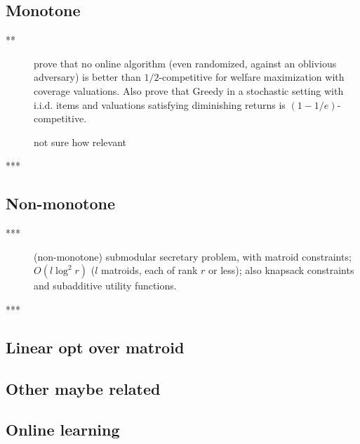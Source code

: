 \documentclass{article}
\begin{document}
\subsection{Monotone}

\begin{description}
\item[\citet{kapralov13}**] prove that no online algorithm (even randomized, against an oblivious adversary) is better than $1/2$-competitive for welfare maximization with coverage valuations. Also prove that Greedy in a stochastic setting with i.i.d. items and valuations satisfying diminishing returns is $(1-1/e)$-competitive.
\item[\citet{buchbinder12}] not sure how relevant
\item[\citet{feldman11sec}***] 
\end{description}


\subsection{Non-monotone}

\begin{description}
\item[\cite{bateni10}***] (non-monotone) submodular secretary problem, with matroid constraints; $O(l \log^2 r)$ ($l$ matroids, each of rank $r$ or less); also knapsack constraints and subadditive utility functions.
\item[\citet{gupta10}***] 
\end{description}

\subsection{Linear opt over matroid}
\begin{description}
\item[\citet{babaioff}]
\item[\citet{ogharan11}]
\item[\citet{imXX}] 
\end{description}

\subsection{Other maybe related}
\begin{description}
\item[\citet{feldman12parallel}] 
\end{description}


\subsection{Online learning}
\end{document}
